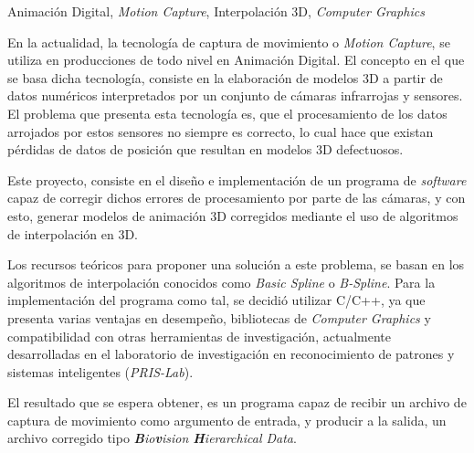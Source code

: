 
\begin{resumen}{Animación Digital, \textit{Motion Capture}, Interpolación 3D, \textit{Computer Graphics}}

En la actualidad, la tecnología de captura de movimiento o \textit{Motion Capture}, se utiliza en producciones de todo nivel en Animación Digital.  El concepto en el que se basa dicha tecnología, consiste en la elaboración de modelos 3D a partir de datos numéricos interpretados por un conjunto de cámaras infrarrojas y sensores.  El problema que presenta esta tecnología es, que el procesamiento de los datos arrojados por estos sensores no siempre es correcto, lo cual hace que existan pérdidas de datos de posición que resultan en modelos 3D defectuosos.

Este proyecto, consiste en el diseño e implementación de un programa de \textit{software} capaz de corregir dichos errores de procesamiento por parte de las cámaras, y con esto, generar modelos de animación 3D corregidos mediante el uso de algoritmos de interpolación en 3D.

Los recursos teóricos para proponer una solución a este problema, se basan en los algoritmos de interpolación conocidos como \textit{Basic Spline} o \textit{B-Spline}.  Para la implementación del programa como tal, se decidió utilizar C/C++, ya que presenta varias ventajas en desempeño, bibliotecas de \textit{Computer Graphics} y compatibilidad con otras herramientas de investigación, actualmente desarrolladas en el laboratorio de investigación en reconocimiento de patrones y sistemas inteligentes (\textit{PRIS-Lab}).

El resultado que se espera obtener, es un programa capaz de recibir un archivo de captura de movimiento como argumento de entrada, y producir a la salida, un archivo corregido tipo \textit{\textbf{B}io\textbf{v}ision \textbf{H}ierarchical Data}.

\end{resumen}
